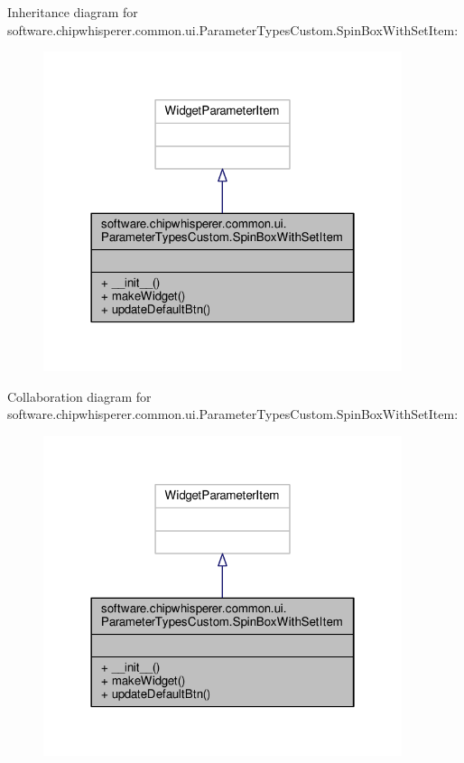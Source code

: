 Inheritance diagram for software.\+chipwhisperer.\+common.\+ui.\+Parameter\+Types\+Custom.\+Spin\+Box\+With\+Set\+Item\+:\nopagebreak
\begin{figure}[H]
\begin{center}
\leavevmode
\includegraphics[width=298pt]{d0/d08/classsoftware_1_1chipwhisperer_1_1common_1_1ui_1_1ParameterTypesCustom_1_1SpinBoxWithSetItem__inherit__graph}
\end{center}
\end{figure}


Collaboration diagram for software.\+chipwhisperer.\+common.\+ui.\+Parameter\+Types\+Custom.\+Spin\+Box\+With\+Set\+Item\+:\nopagebreak
\begin{figure}[H]
\begin{center}
\leavevmode
\includegraphics[width=298pt]{d5/dd9/classsoftware_1_1chipwhisperer_1_1common_1_1ui_1_1ParameterTypesCustom_1_1SpinBoxWithSetItem__coll__graph}
\end{center}
\end{figure}


